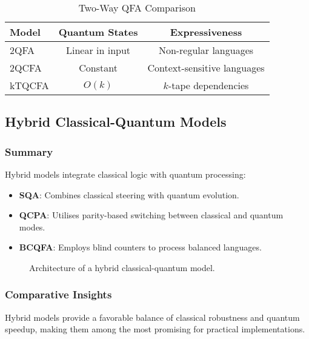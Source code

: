 \begin{table}[ht]
\centering
\caption{Two-Way QFA Comparison}
\label{tab:two_way}
\begin{tabular}{|l|c|c|}
\hline
\textbf{Model} & \textbf{Quantum States} & \textbf{Expressiveness} \\ \hline
2QFA  & Linear in input & Non-regular languages \\ \hline
2QCFA & Constant & Context-sensitive languages \\ \hline
kTQCFA & $O(k)$ & $k$-tape dependencies \\ \hline
\end{tabular}
\end{table}

\subsection*{Hybrid Classical-Quantum Models}

\subsubsection{Summary}
Hybrid models integrate classical logic with quantum processing:
\begin{itemize}
    \item \textbf{SQA}: Combines classical steering with quantum evolution.
    \item \textbf{QCPA}: Utilises parity-based switching between classical and quantum modes.
    \item \textbf{BCQFA}: Employs blind counters to process balanced languages.
\end{itemize}

\begin{figure}[ht]
\centering
{}
\caption{Architecture of a hybrid classical-quantum model.}
\label{fig:hybrid}
\end{figure}

\subsubsection{Comparative Insights}
Hybrid models provide a favorable balance of classical robustness and quantum speedup, making them among the most promising for practical implementations.

